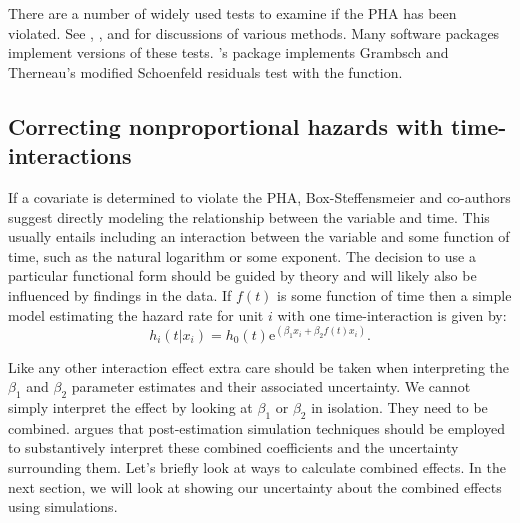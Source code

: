 \documentclass[nojss]{jss}\usepackage[]{graphicx}\usepackage[]{color}
\begin{document}
There are a number of widely used tests to examine if the PHA has been violated. See \cite{Grambsch1994}, \cite{BoxSteffensmeier2001}, and \cite{boxsteffensmeier2004} for discussions of various methods. Many software packages implement versions of these tests. 's  package \citep{R-survival} implements Grambsch and Therneau's \citeyearpar{Grambsch1994} modified Schoenfeld residuals test with the  function.

\subsection[Nonproportional and time-interactive]{Correcting nonproportional hazards with time-interactions}

If a covariate is determined to violate the PHA, Box-Steffensmeier and co-authors \citep[see][]{BoxSteffensmeier2003,boxsteffensmeier2004} suggest directly modeling the relationship between the variable and time. This usually entails including an interaction between the variable and some function of time, such as the natural logarithm or some exponent. The decision to use a particular functional form should be guided by theory and will likely also be influenced by findings in the data. If $f(t)$ is some function of time then a simple model estimating the hazard rate for unit $i$ with one time-interaction is given by:
%
\begin{equation}
    h_{i}(t|x_{i})=h_{0}(t)\mathrm{e}^{(\beta_{1}x_{i} + \beta_{2}f(t)x_{i})}.
\end{equation}

Like any other interaction effect \cite[see][]{Brambor2006} extra care should be taken when interpreting the $\beta_{1}$ and $\beta_{2}$ parameter estimates and their associated uncertainty. We cannot simply interpret the effect by looking at $\beta_{1}$ or $\beta_{2}$ in isolation. They need to be combined. \cite{Licht2011} argues that post-estimation simulation techniques should be employed to substantively interpret these combined coefficients and the uncertainty surrounding them. Let's briefly look at ways to calculate combined effects. In the next section, we will look at showing our uncertainty about the combined effects using simulations.
\end{document}
